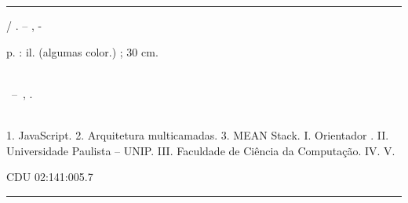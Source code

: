 \documentclass[
	12pt,				%
	openright,			%
	twoside,			%
	a4paper,			%
	english,			%
	brazil				%
	]{abntex2}
\begin{document}
\frenchspacing 


\imprimircapa

\imprimirfolhaderosto*


%
%     
\begin{fichacatalografica}
	\vspace*{\fill}					%
	\hrule							%
	\begin{center}					%
	\begin{minipage}[c]{12.5cm}		%
	
	\imprimirautor
	
	\hspace{0.5cm} \imprimirtitulo  / \imprimirautor. --
	\imprimirlocal, \imprimirdata-
	
	\hspace{0.5cm} \pageref{LastPage} p. : il. (algumas color.) ; 30 cm.\\
	
	\hspace{0.5cm} \imprimirorientadorRotulo~\imprimirorientador\\
	
	\hspace{0.5cm}
	\parbox[t]{\textwidth}{\imprimirtipotrabalho~--~\imprimirinstituicao,
	\imprimirdata.}\\
	
	\hspace{0.5cm}
		1. JavaScript.
        2. Arquitetura multicamadas.
        3. MEAN Stack.
		I. Orientador \imprimirorientador.
		II. Universidade Paulista -- UNIP.
		III. Faculdade de Ciência da Computação.
		IV. \imprimirtitulo 
		V. \imprimirautor
	
	\hspace{8.75cm} CDU 02:141:005.7\\
	
	\end{minipage}
	\end{center}
	\hrule
\end{fichacatalografica}
\end{document}
